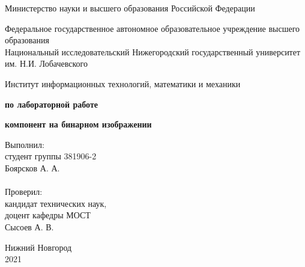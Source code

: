 \documentclass{report}
\begin{document}
\begin{titlepage}

\begin{center}
Министерство науки и высшего образования Российской Федерации
\end{center}

\begin{center}
Федеральное государственное автономное образовательное учреждение высшего образования \\
Национальный исследовательский Нижегородский государственный университет им. Н.И. Лобачевского
\end{center}

\begin{center}
Институт информационных технологий, математики и механики
\end{center}

\vspace{4em}

\begin{center}
\textbf{ по лабораторной работе} \\
\end{center}
\begin{center}
\textbf{ компонент на бинарном изображении} \\
\end{center}

\vspace{4em}

\newbox{\lbox}
\newlength{\maxl}
\setlength{\maxl}{\wd\lbox}
\hfill\parbox{7cm}{
\hspace*{5cm}\hspace*{-5cm}Выполнил: \\ студент группы 381906-2 \\ Боярсков А. А.\\
\\
\hspace*{5cm}\hspace*{-5cm}Проверил:\\ кандидат технических наук, \\ доцент кафедры МОСТ \\ Сысоев А. В.\\
}
\vspace{\fill}

\begin{center} Нижний Новгород 
\\ 2021 \end{center}

\end{titlepage}
\end{document}
